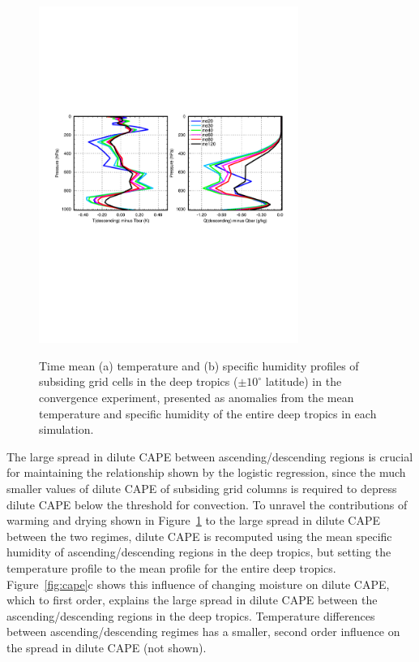 \documentclass[times]{qjrms4}
\begin{document}
\begin{figure}
\begin{center}
\noindent\includegraphics[width=20pc,angle=0]{figs/temp_profiles.pdf}\\
\end{center}
\caption{Time mean (a) temperature and (b) specific humidity profiles of subsiding grid cells in the deep tropics ($\pm 10^{\circ}$ latitude) in the convergence experiment, presented as anomalies from the mean temperature and specific humidity of the entire deep tropics in each simulation.}
\label{fig:profiles}
\end{figure}

The large spread in dilute CAPE between ascending/descending regions is crucial for maintaining the relationship shown by the logistic regression, since the much smaller values of dilute CAPE of subsiding grid columns is required to depress dilute CAPE below the threshold for convection. To unravel the contributions of warming and drying shown in Figure~\ref{fig:profiles} to the large spread in dilute CAPE between the two regimes, dilute CAPE is recomputed using the mean specific humidity of ascending/descending regions in the deep tropics, but setting the temperature profile to the mean profile for the entire deep tropics. Figure~\ref{fig:cape}c shows this influence of changing moisture on dilute CAPE, which to first order, explains the large spread in dilute CAPE between the ascending/descending regions in the deep tropics. Temperature differences between ascending/descending regimes has a smaller, second order influence on the spread in dilute CAPE (not shown).
\end{document}
